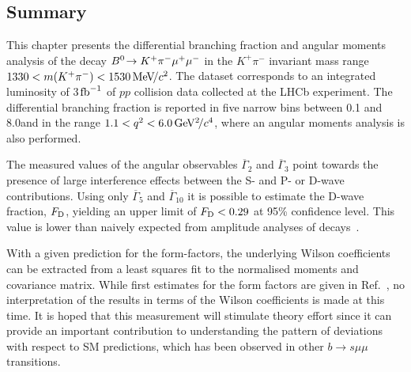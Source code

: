 \subsection{Summary}

This chapter presents the differential branching fraction and angular moments analysis of the decay ${B}^0\!\rightarrow K^{+}\pi^{-}\mu^{+}\mu^{-}$ in the $K^{+}\pi^{-}$ invariant mass range $1330<m({{K}^+}{{\pi}^-})<1530\mathrm{\,Me\kern -0.1em V\!/}c^{2}$.  The dataset corresponds to an integrated luminosity of 3$\ensuremath{\mbox{\,fb}^{-1}}\xspace$ of $pp$ collision data collected at the LHCb experiment.  The differential branching fraction is reported in five narrow \qsq bins between 0.1 and 8.0\gevgevcccc and in the range $1.1<{q^2}<6.0{\mathrm{\,Ge\kern -0.1em V^2\!/}c^4}$, where an angular moments analysis is also performed.

The measured values of the angular observables $\overline{\Gamma}_{2}$ and $\overline{\Gamma}_{3}$ point towards the presence of large interference effects between the S- and P- or D-wave contributions. Using only $\overline{\Gamma}_{5}$ and $\overline{\Gamma}_{10}$ it is possible to estimate the D-wave fraction, $F_{\rm D}$,  yielding an upper limit of $F_{\rm D}<0.29$ at 95\% confidence level. This value is lower than naively expected from amplitude analyses of \BdToJPsiKpi decays~\cite{belle-z-paper}.

With a given prediction for the form-factors, the underlying Wilson coefficients can be extracted from a least squares fit to the normalised moments and covariance matrix. While first estimates for the form factors are given in Ref.~\cite{lu-wang}, no interpretation of the results in terms of the Wilson coefficients is made at this time.  It is hoped that this measurement will stimulate theory effort since it can provide an important contribution to understanding the pattern of deviations with respect to SM predictions, which has been observed in other $b\to s\mu\mu$ transitions.